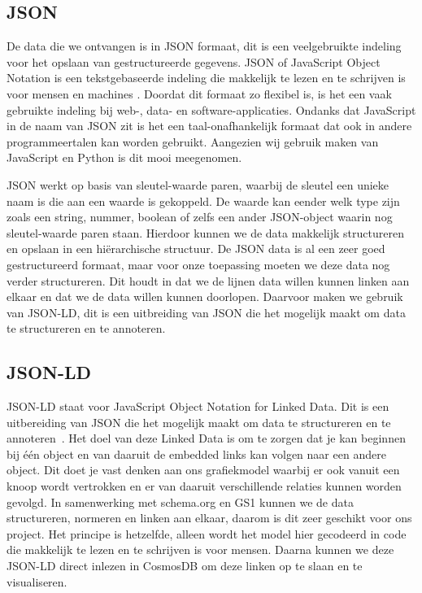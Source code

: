 \subsection{JSON}
De data die we ontvangen is in JSON formaat, dit is een veelgebruikte indeling voor het opslaan van gestructureerde gegevens.
JSON of JavaScript Object Notation is een tekstgebaseerde indeling die makkelijk te lezen en te schrijven is voor mensen en machines \autocite{Erickson2024}.
Doordat dit formaat zo flexibel is, is het een vaak gebruikte indeling bij web-, data- en software-applicaties.
Ondanks dat JavaScript in de naam van JSON zit is het een taal-onafhankelijk formaat dat ook in andere programmeertalen kan worden gebruikt.
Aangezien wij gebruik maken van JavaScript en Python is dit mooi meegenomen.

JSON werkt op basis van sleutel-waarde paren, waarbij de sleutel een unieke naam is die aan een waarde is gekoppeld.
De waarde kan eender welk type zijn zoals een string, nummer, boolean of zelfs een ander JSON-object waarin nog sleutel-waarde paren staan.
Hierdoor kunnen we de data makkelijk structureren en opslaan in een hiërarchische structuur.
De JSON data is al een zeer goed gestructureerd formaat, maar voor onze toepassing moeten we deze data nog verder structureren.
Dit houdt in dat we de lijnen data willen kunnen linken aan elkaar en dat we de data willen kunnen doorlopen.
Daarvoor maken we gebruik van JSON-LD, dit is een uitbreiding van JSON die het mogelijk maakt om data te structureren en te annoteren.

\subsection{JSON-LD}
JSON-LD staat voor JavaScript Object Notation for Linked Data. Dit is een uitbereiding van JSON die het mogelijk maakt om data te structureren en te annoteren~\autocite{jsonld.org}.
Het doel van deze Linked Data is om te zorgen dat je kan beginnen bij één object en van daaruit de embedded links kan volgen naar een andere object. 
Dit doet je vast denken aan ons grafiekmodel waarbij er ook vanuit een knoop wordt vertrokken en er van daaruit verschillende relaties kunnen worden gevolgd.
In samenwerking met schema.org en GS1 kunnen we de data structureren, normeren en linken aan elkaar, daarom is dit zeer geschikt voor ons project. 
Het principe is hetzelfde, alleen wordt het model hier gecodeerd in code die makkelijk te lezen en te schrijven is voor mensen. 
Daarna kunnen we deze JSON-LD direct inlezen in CosmosDB om deze linken op te slaan en te visualiseren.


